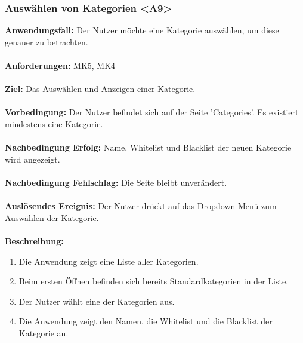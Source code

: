 \documentclass[parskip=full]{scrartcl} %
\begin{document}
\subsubsection*{Auswählen von Kategorien <A9>}
\textbf{Anwendungsfall:} Der Nutzer möchte eine Kategorie auswählen, um diese genauer zu betrachten.\\\\
\textbf{Anforderungen:} MK5, MK4\\\\
\textbf{Ziel:} Das Auswählen und Anzeigen einer Kategorie. \\\\
\textbf{Vorbedingung:} Der Nutzer befindet sich auf der Seite 'Categories'. Es existiert mindestens eine Kategorie. \\\\
\textbf{Nachbedingung Erfolg:} Name, Whitelist und Blacklist der neuen Kategorie wird angezeigt.\\\\
\textbf{Nachbedingung Fehlschlag:} Die Seite bleibt unverändert.\\\\
\textbf{Auslösendes Ereignis:} Der Nutzer drückt auf das Dropdown-Menü zum Auswählen der Kategorie. \\\\
\textbf{Beschreibung:}
\begin{enumerate}
    \item Die Anwendung zeigt eine Liste aller Kategorien.
    \item Beim ersten Öffnen befinden sich bereits Standardkategorien in der Liste.
    \item Der Nutzer wählt eine der Kategorien aus.
    \item Die Anwendung zeigt den Namen, die Whitelist und die Blacklist der Kategorie an.
\end{enumerate}
\newpage
\end{document}
